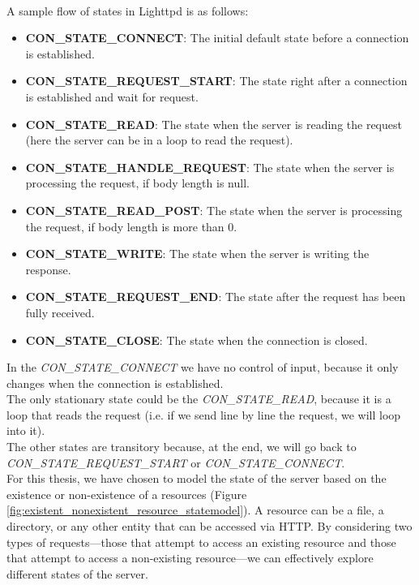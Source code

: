 \\A sample flow of states in Lighttpd is as follows:
\begin{itemize}
    \item \textbf{CON\_STATE\_CONNECT}: The initial default state before a connection is established.
    
    \item \textbf{CON\_STATE\_REQUEST\_START}: The state right after a connection is established and wait for request.
    
    \item \textbf{CON\_STATE\_READ}: The state when the server is reading the request (here the server can be in a loop to read the request).
    
    \item \textbf{CON\_STATE\_HANDLE\_REQUEST}: The state when the server is processing the request, if body length is null.
    
    \item \textbf{CON\_STATE\_READ\_POST}: The state when the server is processing the request, if body length is more than 0.
    
    \item \textbf{CON\_STATE\_WRITE}: The state when the server is writing the response.
    
    \item \textbf{CON\_STATE\_REQUEST\_END}: The state after the request has been fully received.
    
    \item \textbf{CON\_STATE\_CLOSE}: The state when the connection is closed.
\end{itemize}
In the \textit{CON\_STATE\_CONNECT} we have no control of input, because it only changes when the connection is established.
\\The only stationary state could be the \textit{CON\_STATE\_READ}, because it is a loop that reads the request (i.e. if we send line by line the request, we will loop into it).
\\The other states are transitory because, at the end, we will go back to \textit{CON\_STATE\_REQUEST\_START} or \textit{CON\_STATE\_CONNECT}.
\\For this thesis, we have chosen to model the state of the server based on the existence or non-existence of a resources (Figure \ref{fig:existent_nonexistent_resource_statemodel}). A resource can be a file, a directory, or any other entity that can be accessed via HTTP. By considering two types of requests—those that attempt to access an existing resource and those that attempt to access a non-existing resource—we can effectively explore different states of the server.
